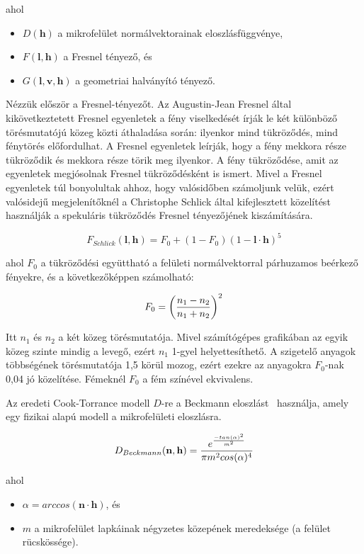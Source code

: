 \vspace{12pt}

\noindent
ahol

\begin{itemize}[noitemsep]
\item \(D(\mathbf{h})\) a mikrofelület normálvektorainak eloszlásfüggvénye,
\item \(F(\mathbf{l}, \mathbf{h})\) a Fresnel tényező, és
\item \(G(\mathbf{l}, \mathbf{v}, \mathbf{h})\) a geometriai halványító tényező.
\end{itemize}

Nézzük először a Fresnel-tényezőt. Az Augustin-Jean Fresnel által kikövetkeztetett Fresnel egyenletek a fény viselkedését írják le két különböző törésmutatójú közeg közti áthaladása során: ilyenkor mind tükröződés, mind fénytörés előfordulhat. A Fresnel egyenletek leírják, hogy a fény mekkora része tükröződik és mekkora része törik meg ilyenkor. A fény tükröződése, amit az egyenletek megjósolnak Fresnel tükröződésként is ismert. Mivel a Fresnel egyenletek túl bonyolultak ahhoz, hogy valósidőben számoljunk velük, ezért valósidejű megjelenítőknél a Christophe Schlick által kifejlesztett közelítést használják a spekuláris tükröződés Fresnel tényezőjének kiszámítására.~\cite{schlick1994inexpensive}

\[
F_{Schlick}(\mathbf{l}, \mathbf{h}) = F_0 + (1 - F_0)(1 - \mathbf{l} \cdot \mathbf{h})^5
\]

ahol \(F_0\) a tükröződési együttható a felületi normálvektorral párhuzamos beérkező fényekre, és a következőképpen számolható:

\[
F_0 = \left( {n_1 - n_2} \over {n_1 + n_2} \right)^2
\]

Itt \(n_1\) és \(n_2\) a két közeg törésmutatója. Mivel számítógépes grafikában az egyik közeg szinte mindig a levegő, ezért \(n_1\) 1-gyel helyettesíthető. A szigetelő anyagok többségének törésmutatója 1,5 körül mozog, ezért ezekre az anyagokra \(F_0\)-nak 0,04 jó közelítése. Fémeknél \(F_0\) a fém színével ekvivalens.

Az eredeti Cook-Torrance modell \(D\)-re a Beckmann eloszlást~\cite{beckmann1987scattering} használja, amely egy fizikai alapú modell a mikrofelületi eloszlásra.

\[
D_{Beckmann}(\mathbf{n}, \mathbf{h}) = { { e^{ -tan(\alpha)^2 \over m^2 } } \over { \pi m^2 cos(\alpha)^4 } }
\]

\noindent
ahol

\begin{itemize}[noitemsep]
\item \(\alpha = arccos(\mathbf{n} \cdot \mathbf{h})\), és
\item \(m\) a mikrofelület lapkáinak négyzetes közepének meredeksége (a felület rücskössége).
\end{itemize}

